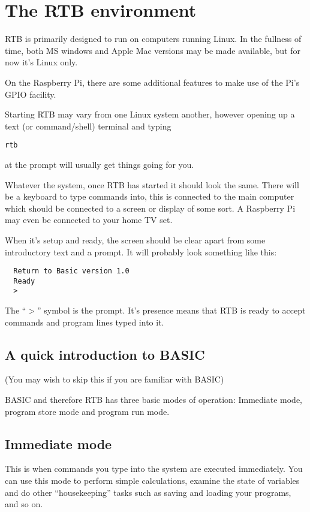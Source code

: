 \chapter{The RTB environment}

RTB is primarily designed to run on computers running Linux. In the
fullness of time, both MS windows and Apple Mac versions may be made
available, but for now it's Linux only.

On the Raspberry Pi, there are some additional features to make use of
the Pi's GPIO facility.

Starting RTB may vary from one Linux system another, however opening up
a text (or command/shell) terminal and typing

{\tt rtb}

at the prompt will usually get things going for you.

Whatever the system, once RTB has started it should look the same. There
will be a keyboard to type commands into, this is connected to the main
computer which should be connected to a screen or display of some sort. A
Raspberry Pi may even be connected to your home TV set.

When it's setup and ready, the screen should be clear apart from some
introductory text and a prompt. It will probably look something like this:
\begin{verbatim}
  Return to Basic version 1.0 
  Ready
  >
\end{verbatim}
The ``$>$'' symbol is the prompt. It's presence means that RTB is ready to
accept commands and program lines typed into it.

\section{A quick introduction to BASIC}
(You may wish to skip this if you are familiar with BASIC)

BASIC and therefore RTB has three basic modes of operation: Immediate
mode, program store mode and program run mode.

\section{Immediate mode}
This is when commands you type into the system are executed immediately.
You can use this mode to perform simple calculations, examine the state
of variables and do other ``housekeeping'' tasks such as saving and loading
your programs, and so on.

